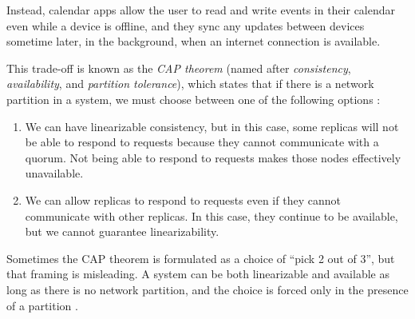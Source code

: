 
\begin{frame}[plain]
    \label{s:calendar}
\end{frame}
\label{l:calendar}

Instead, calendar apps allow the user to read and write events in their calendar even while a device is offline, and they sync any updates between devices sometime later, in the background, when an internet connection is available.

This trade-off is known as the \emph{CAP theorem} (named after \emph{consistency}, \emph{availability}, and \emph{partition tolerance}), which states that if there is a network partition in a system, we must choose between one of the following options \citep{Gilbert:2002}:
\begin{enumerate}
    \item We can have linearizable consistency, but in this case, some replicas will not be able to respond to requests because they cannot communicate with a quorum.
        Not being able to respond to requests makes those nodes effectively unavailable.
    \item We can allow replicas to respond to requests even if they cannot communicate with other replicas.
        In this case, they continue to be available, but we cannot guarantee linearizability.
\end{enumerate}
Sometimes the CAP theorem is formulated as a choice of ``pick 2 out of 3'', but that framing is misleading.
A system can be both linearizable and available as long as there is no network partition, and the choice is forced only in the presence of a partition \citep{Kleppmann:2015}.

